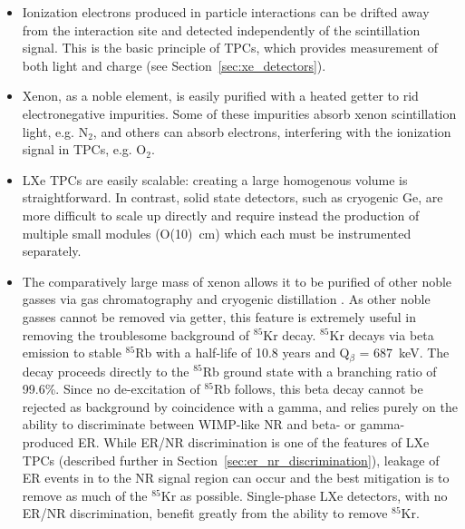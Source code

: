 \begin{itemize}
\item Ionization electrons produced in particle interactions can be drifted away from the interaction site and detected independently of the scintillation signal. This is the basic principle of \ac{TPC}s, which provides measurement of both light and charge (see Section~\ref{sec:xe_detectors}).  
    
\item Xenon, as a noble element, is easily purified with a heated getter to rid electronegative impurities. Some of these impurities absorb xenon scintillation light, e.g. N$_{2}$, and others can absorb electrons, interfering with the ionization signal in \ac{TPC}s, e.g. O$_{2}$.

\item \ac{LXe} \ac{TPC}s are easily scalable: creating a large homogenous volume is straightforward. In contrast, solid state detectors, such as cryogenic Ge, are more difficult to scale up directly and require instead the production of multiple small modules (O(10)~cm) which each must be instrumented separately.  
  
\item The comparatively large mass of xenon allows it to be purified of other noble gasses via gas chromatography \cite{LUXKrRemoval2018} and cryogenic distillation \cite{Xe1TKrRemoval2017}. As other noble gasses cannot be removed via getter, this feature is extremely useful in removing the troublesome background of $^{85}$Kr decay. $^{85}$Kr decays via beta emission to stable $^{85}$Rb with a half-life of 10.8 years and Q$_{\beta}$ = 687~keV. The decay proceeds directly to the $^{85}$Rb ground state with a branching ratio of 99.6\%. Since no de-excitation of $^{85}$Rb follows, this beta decay cannot be rejected as background by coincidence with a gamma, and relies purely on the ability to discriminate between \ac{WIMP}-like \ac{NR} and beta- or gamma- produced \ac{ER}. While ER/NR discrimination is one of the features of \ac{LXe} \ac{TPC}s (described further in Section~\ref{sec:er_nr_discrimination}), leakage of \ac{ER} events in to the \ac{NR} signal region can occur and the best mitigation is to remove as much of the $^{85}$Kr as possible. Single-phase \ac{LXe} detectors, with no ER/NR discrimination, benefit greatly from the ability to remove $^{85}$Kr.
   
\end{itemize}


